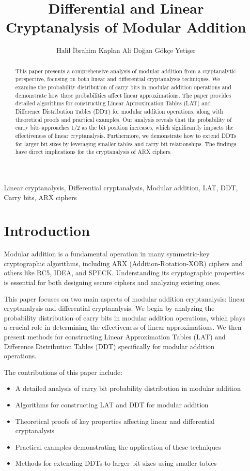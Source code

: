 \documentclass[runningheads]{llncs}
\title{Differential and Linear Cryptanalysis of Modular Addition}
\author{Halil \.{I}brahim Kaplan\inst{1} Ali Doğan \inst{2} Gökçe Yetişer \inst{3} }
\institute{Cryptanalsis Laboratory, Tübitak BİLGEM, Kocaeli, Turkey \\ \email{halil.kaplan@tubitak.gov.tr} \and Istanbul Settlement and Custody Bank(TAKASBANK), Istanbul, Turkey \\ \email{adogan@takasbank.com.tr
} \and Teila, Stockholm, Switzerland \\ \email{gokceyetiser@gmail.com} }
\begin{document}
\maketitle

\begin{keywords}
Linear cryptanalysis, Differential cryptanalysis, Modular addition, LAT, DDT, Carry bits, ARX ciphers
\end{keywords}

\begin{abstract}
This paper presents a comprehensive analysis of modular addition from a cryptanalytic perspective, focusing on both linear and differential cryptanalysis techniques. We examine the probability distribution of carry bits in modular addition operations and demonstrate how these probabilities affect linear approximations. The paper provides detailed algorithms for constructing Linear Approximation Tables (LAT) and Difference Distribution Tables (DDT) for modular addition operations, along with theoretical proofs and practical examples. Our analysis reveals that the probability of carry bits approaches 1/2 as the bit position increases, which significantly impacts the effectiveness of linear cryptanalysis. Furthermore, we demonstrate how to extend DDTs for larger bit sizes by leveraging smaller tables and carry bit relationships. The findings have direct implications for the cryptanalysis of ARX ciphers.
\end{abstract}

\section{Introduction}
Modular addition is a fundamental operation in many symmetric-key cryptographic algorithms, including ARX (Addition-Rotation-XOR) ciphers and others like RC5, IDEA, and SPECK. Understanding its cryptographic properties is essential for both designing secure ciphers and analyzing existing ones.

This paper focuses on two main aspects of modular addition cryptanalysis: linear cryptanalysis and differential cryptanalysis. We begin by analyzing the probability distribution of carry bits in modular addition operations, which plays a crucial role in determining the effectiveness of linear approximations. We then present methods for constructing Linear Approximation Tables (LAT) and Difference Distribution Tables (DDT) specifically for modular addition operations.

The contributions of this paper include:
\begin{itemize}
\item A detailed analysis of carry bit probability distribution in modular addition
\item Algorithms for constructing LAT and DDT for modular addition
\item Theoretical proofs of key properties affecting linear and differential cryptanalysis
\item Practical examples demonstrating the application of these techniques
\item Methods for extending DDTs to larger bit sizes using smaller tables
\end{itemize}
\end{document}

